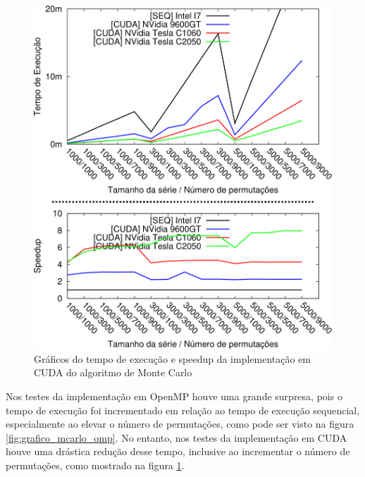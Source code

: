 \begin{figure}[H]
\centering
\includegraphics[]{Imagens/graficos_mcarlo/mcarlo_cuda.png}
\caption{Gráficos do tempo de execução e speedup da implementação em CUDA do algoritmo de Monte Carlo}
\label{fig:graficos_mcarlo_cuda}
\end{figure}

Nos testes da implementação em OpenMP houve uma grande surpresa, pois o tempo de execução foi incrementado em relação ao tempo de execução sequencial, especialmente ao elevar o número de permutações, como pode ser visto na figura \ref{fig:grafico_mcarlo_omp}. No entanto, nos testes da implementação em CUDA houve uma drástica redução desse tempo, inclusive ao incrementar o número de permutações, como mostrado na figura \ref{fig:graficos_mcarlo_cuda}.

